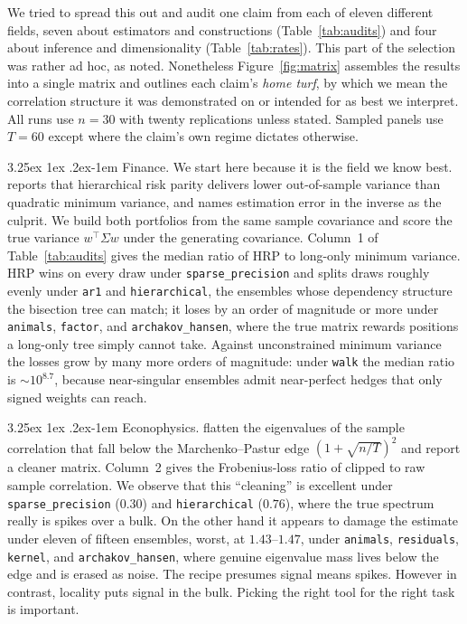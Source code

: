 \documentclass[11pt]{article}
\makeatletter
\renewcommand\paragraph{\@startsection{paragraph}{4}{\z@}%
  {3.25ex \@plus1ex \@minus.2ex}{-1em}%
  {\normalfont\normalsize\itshape}}
\makeatother
\begin{document}
We tried to spread this out and audit one claim from each of eleven
different fields, seven about estimators and constructions
(Table~\ref{tab:audits}) and four about inference and dimensionality
(Table~\ref{tab:rates}). This part of the selection was rather ad hoc, as noted.
Nonetheless Figure~\ref{fig:matrix} assembles the results
into a single matrix and outlines each claim's \emph{home turf}, by which we mean the
correlation structure it was demonstrated on or intended for as best we interpret. All runs
use $n=30$ with twenty replications unless stated. Sampled panels use
$T=60$ except where the claim's own regime dictates otherwise.

\paragraph{Finance.} We start here because it is the field we know best.
\citet{lopezdeprado2016} reports that hierarchical
risk parity delivers lower out-of-sample variance than quadratic minimum
variance, and names estimation error in the inverse as the culprit. We
build both portfolios from the same sample covariance and score the true
variance $w^{\top}\Sigma w$ under the generating covariance. Column~1 of
Table~\ref{tab:audits} gives the median ratio of HRP to long-only minimum
variance. HRP wins on every draw under \texttt{sparse\_precision} and
splits draws roughly evenly under \texttt{ar1} and \texttt{hierarchical},
the ensembles whose dependency structure the bisection tree can match; it
loses by an order of magnitude or more under \texttt{animals},
\texttt{factor}, and \texttt{archakov\_hansen}, where the true matrix
rewards positions a long-only tree simply cannot take. Against unconstrained
minimum variance the losses grow by many more orders of magnitude: under
\texttt{walk} the median ratio is $\sim\!10^{8.7}$, because near-singular
ensembles admit near-perfect hedges that only signed weights can reach.

\paragraph{Econophysics.} \citet{laloux1999} flatten the eigenvalues
of the sample correlation that fall below the Marchenko--Pastur edge
$(1+\sqrt{n/T})^{2}$ and report a cleaner matrix. Column~2 gives the
Frobenius-loss ratio of clipped to raw sample correlation. We observe that this ``cleaning'' is
excellent under \texttt{sparse\_precision} ($0.30$) and
\texttt{hierarchical} ($0.76$), where the true spectrum really is spikes
over a bulk. On the other hand it appears to damage the estimate under eleven of fifteen ensembles, worst, at
$1.43$--$1.47$, under \texttt{animals}, \texttt{residuals},
\texttt{kernel}, and \texttt{archakov\_hansen}, where genuine eigenvalue
mass lives below the edge and is erased as noise. The recipe presumes signal
means spikes. However in contrast, locality puts signal in the bulk. Picking the right tool for the right task is important.
\end{document}
